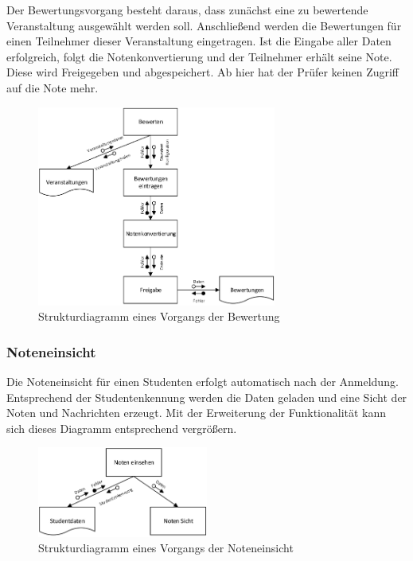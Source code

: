 \begin{appendix}
		Der Bewertungsvorgang besteht daraus, dass zunächst eine zu bewertende  Veranstaltung ausgewählt werden soll. Anschließend werden die Bewertungen für einen Teilnehmer dieser Veranstaltung eingetragen. Ist die Eingabe aller Daten erfolgreich, folgt die Notenkonvertierung und der Teilnehmer erhält seine Note. Diese wird Freigegeben und abgespeichert. Ab hier hat der Prüfer keinen Zugriff auf die Note mehr.
	
			\begin{figure}[H]
				\centering
				\includegraphics[width=0.7\textwidth]{./img/sd_bewerten}
				\caption{Strukturdiagramm eines Vorgangs der Bewertung}
				\label{fig:sd_bewerten}
			\end{figure}
	
	\subsubsection{Noteneinsicht}
	
	Die Noteneinsicht für einen Studenten erfolgt automatisch nach der Anmeldung. Entsprechend der Studentenkennung werden die Daten geladen und eine Sicht der Noten und Nachrichten erzeugt. Mit der Erweiterung der Funktionalität kann sich dieses Diagramm entsprechend vergrößern.
	
				\begin{figure}[H]
					\centering
					\includegraphics[width=0.5\textwidth]{./img/sd_noten_einsicht}
					\caption{Strukturdiagramm eines Vorgangs der Noteneinsicht}
					\label{fig:sd_noten_einsicht}
				\end{figure}
	

\end{appendix}

